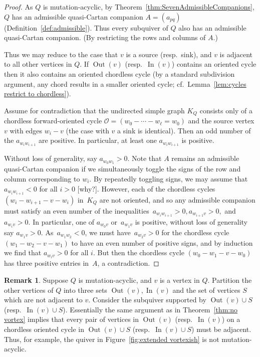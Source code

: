 \documentclass[11pt, letterpaper]{amsart}
\theoremstyle{definition}
\newtheorem{remark}[theorem]{Remark}
\numberwithin{equation}{section}
\def\In{{\operatorname{In}}}
\def\Out{{\operatorname{Out}}}
\begin{document}
\begin{proof}
As $Q$ is mutation-acyclic, by Theorem~\ref{thm:SevenAdmissibleCompanions}, $Q$ has an admissible quasi-Cartan companion $A = (a_{pq})$ (Definition~\ref{def:admissible}).
Thus every subquiver of $Q$ also has an admissible quasi-Cartan companion. 
(By restricting the rows and columns of $A$.)

Thus we may reduce to the case that $v$ is a source (resp.\ sink), and $v$ is adjacent to all other vertices in $Q$.
If $\Out(v)$ (resp.\ $\In(v)$) contains an oriented cycle then it also contains an oriented chordless cycle (by a standard subdivision argument, any chord results in a smaller oriented cycle; cf.\ Lemma~\ref{lem:cycles restrict to chordless}).

Assume for contradiction that the undirected simple graph $K_Q$ consists only of a chordless forward-oriented cycle $\mathcal O = (w_0 - \cdots - w_\ell = w_0)$ and the source vertex $v$ with edges $w_i - v$ (the case with $v$ a sink is identical). 
Then an odd number of the $a_{w_i w_{i+1}}$ are positive.
In particular, at least one $a_{w_i w_{i+1}}$ is positive. 

Without loss of generality, say $a_{w_0 w_1} > 0$. 
Note that $A$ remains an admissible quasi-Cartan companion if we simultaneously toggle the signs of the row and column corresponding to $w_i$.
By repeatedly toggling signs, we may assume that $a_{w_i w_{i+1}} < 0$ for all $i>0$ [why?].
However, each of the chordless cycles $(w_i - w_{i+1} - v - w_i)$ in~$K_Q$ are not oriented, and so any admissible companion must satisfy an even number of the inequalities~${a_{w_i w_{i+1}}>0}, {a_{w_{i+1} v}>0},$ and~${a_{w_i v}>0}$.
In particular, one of $a_{w_0 v}$ or~$a_{w_{1} v}$ is positive, without loss of generality say $a_{w_{1} v} > 0$.
As~$a_{w_1 w_2} < 0$, we must have~$a_{w_2 v} > 0$ for the chordless cycle $(w_1 - w_{2} - v - w_1)$ to have an even number of positive signs, and by induction we find that $a_{w_i v} > 0$ for all $i$.
But then the chordless cycle $(w_0 - w_{1} - v - w_0)$ has three positive entries in~$A$, a contradiction.
\end{proof}

\begin{remark}
Suppose $Q$ is mutation-acyclic, and $v$ is a vertex in $Q$. 
Partition the other vertices of $Q$ into three sets $\Out(v), \In(v)$ and the set of vertices $S$ which are not adjacent to $v$. 
Consider the subquiver supported by $\Out(v) \cup S$ (resp.\ $\In(v) \cup S$).
Essentially the same argument as in Theorem~\ref{thm:no vortex} implies that every pair of vertices in $\Out(v)$ (resp.\ $\In(v)$) on a chordless oriented cycle in  $\Out(v) \cup S$ (resp.\ $\In(v) \cup S$) must be adjacent. %
Thus, for example, the quiver in Figure~\ref{fig:extended vortexish} is not mutation-acyclic.
\end{remark}
\end{document}
